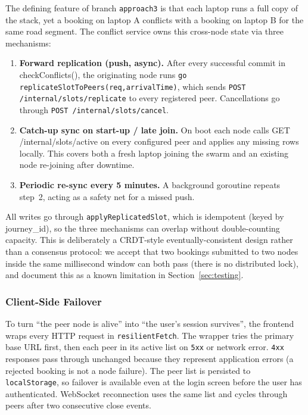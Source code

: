 \documentclass[12pt,a4paper]{article}
\begin{document}
The defining feature of branch \texttt{approach3} is that each laptop runs a full copy of the stack, yet a booking on laptop A conflicts with a booking on laptop B for the same road segment. The conflict service owns this cross-node state via three mechanisms:

\begin{enumerate}
  \item \textbf{Forward replication (push, async).} After every
        successful commit in checkConflicts(), the originating
        node runs \texttt{go replicateSlotToPeers(req,arrivalTime)},
        which sends \texttt{POST /internal/slots/replicate} to every
        registered peer. Cancellations go through
        \texttt{POST /internal/slots/cancel}.
  \item \textbf{Catch-up sync on start-up / late join.} On boot each
        node calls GET /internal/slots/active on every
        configured peer and applies any missing rows locally. This
        covers both a fresh laptop joining the swarm and an existing
        node re-joining after downtime.
  \item \textbf{Periodic re-sync every 5 minutes.} A background
        goroutine repeats step~2, acting as a safety net for a missed
        push.
\end{enumerate}

All writes go through \texttt{applyReplicatedSlot}, which is idempotent (keyed by journey\_id), so the three mechanisms can overlap without double-counting capacity. This is deliberately a CRDT-style eventually-consistent design rather than a consensus protocol: we accept that two bookings submitted to two nodes inside the same millisecond window can both pass (there is no distributed lock), and document this as a known limitation in Section~\ref{sec:testing}.

\subsubsection{Client-Side Failover}

To turn ``the peer node is alive'' into ``the user's session survives'', the frontend wraps every HTTP request in \texttt{resilientFetch}. The wrapper tries the primary base URL first, then each peer in its active list on \texttt{5xx} or network error. \texttt{4xx} responses pass through unchanged because they represent application errors (a rejected booking is not a node failure). The peer list is persisted to \texttt{localStorage}, so failover is available even at the login screen before the user has authenticated. WebSocket reconnection uses the same list and cycles through peers after two consecutive close events.
\end{document}
